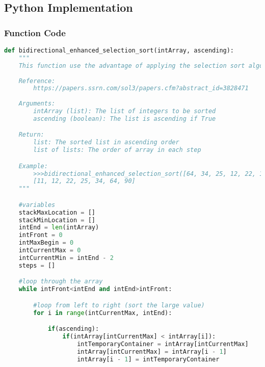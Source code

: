 \documentclass{article}
\begin{document}
\subsection*{Python Implementation}
\subsubsection*{Function Code}
\begin{lstlisting}[language=Python]
def bidirectional_enhanced_selection_sort(intArray, ascending):
    """
    This function use the advantage of applying the selection sort algorithm bidirectionally (from left to right & right to left in one iteration), swapping the previous maximum/minimum to the location before the new maximum/minimum, storing the new location of previous maximum/minimum to the stack, and once there's no new maximum/minimum, then the current maximum/minimum will be place to its correct position. To continue, the previous maximum/minimum in the stack will be use as the starting point for the next iteration and will repeat the process until the array is sorted. And Finally, the sorting will stop when there is no swapped performed and empty stack or the stack pop of both are equal, or the front search is greater than the end search and the end search is less than the front search.
    
    Reference:
        https://papers.ssrn.com/sol3/papers.cfm?abstract_id=3828471
        
    Arguments:
        intArray (list): The list of integers to be sorted
        ascending (boolean): The list is ascending if True

    Return:
        list: The sorted list in ascending order
        list of lists: The order of array in each step

    Example:
        >>>bidirectional_enhanced_selection_sort([64, 34, 25, 12, 22, 11, 90])
        [11, 12, 22, 25, 34, 64, 90]
    """

    #variables
    stackMaxLocation = []
    stackMinLocation = []
    intEnd = len(intArray)
    intFront = 0
    intMaxBegin = 0
    intCurrentMax = 0
    intCurrentMin = intEnd - 2
    steps = []

    #loop through the array
    while intFront<intEnd and intEnd>intFront:

        #loop from left to right (sort the large value)
        for i in range(intCurrentMax, intEnd):

            if(ascending):
                if(intArray[intCurrentMax] < intArray[i]):
                    intTemporaryContainer = intArray[intCurrentMax]
                    intArray[intCurrentMax] = intArray[i - 1]
                    intArray[i - 1] = intTemporaryContainer


\end{lstlisting}
\end{document}
